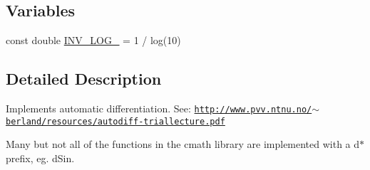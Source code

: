 \subsection*{Variables}
\begin{DoxyCompactItemize}
\item 
const double \hyperlink{namespaceautodiff_ac438d71cd4847e9f19efe6a4f1cfd5d7}{I\-N\-V\-\_\-\-L\-O\-G\-\_} = 1 / log(10)
\end{DoxyCompactItemize}


\subsection{Detailed Description}
Implements automatic differentiation. See\-: \href{http://www.pvv.ntnu.no/~berland/resources/autodiff-triallecture.pdf}{\tt http\-://www.\-pvv.\-ntnu.\-no/$\sim$berland/resources/autodiff-\/triallecture.\-pdf}

Many but not all of the functions in the {\ttfamily cmath} library are implemented with a {\ttfamily d$\ast$} prefix, eg. {\ttfamily d\-Sin}. 

